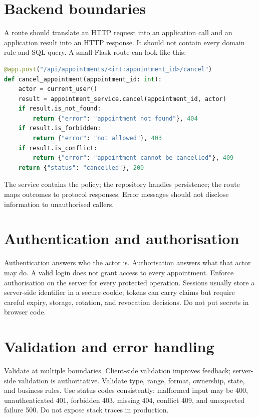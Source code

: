 \section{Backend boundaries}
A route should translate an HTTP request into an application call and an application result into an HTTP response. It should not contain every domain rule and SQL query. A small Flask route can look like this:

\begin{lstlisting}[language=Python,caption={A deliberately thin route boundary.}]
@app.post("/api/appointments/<int:appointment_id>/cancel")
def cancel_appointment(appointment_id: int):
    actor = current_user()
    result = appointment_service.cancel(appointment_id, actor)
    if result.is_not_found:
        return {"error": "appointment not found"}, 404
    if result.is_forbidden:
        return {"error": "not allowed"}, 403
    if result.is_conflict:
        return {"error": "appointment cannot be cancelled"}, 409
    return {"status": "cancelled"}, 200
\end{lstlisting}

The service contains the policy; the repository handles persistence; the route maps outcomes to protocol responses. Error messages should not disclose information to unauthorised callers.

\section{Authentication and authorisation}
Authentication answers who the actor is. Authorisation answers what that actor may do. A valid login does not grant access to every appointment. Enforce authorisation on the server for every protected operation. Sessions usually store a server-side identifier in a secure cookie; tokens can carry claims but require careful expiry, storage, rotation, and revocation decisions. Do not put secrets in browser code.

\section{Validation and error handling}
Validate at multiple boundaries. Client-side validation improves feedback; server-side validation is authoritative. Validate type, range, format, ownership, state, and business rules. Use status codes consistently: malformed input may be 400, unauthenticated 401, forbidden 403, missing 404, conflict 409, and unexpected failure 500. Do not expose stack traces in production.

